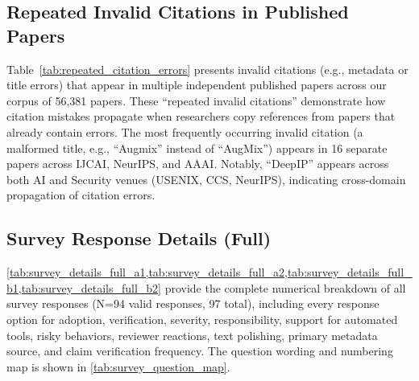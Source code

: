 

\subsection{Repeated Invalid Citations in Published Papers}
\label{app:repeated_citations}

Table~\ref{tab:repeated_citation_errors} presents invalid citations (e.g., metadata or title errors) that appear in multiple independent published papers across our corpus of 56,381 papers.
These ``repeated invalid citations'' demonstrate how citation mistakes propagate when researchers copy references from papers that already contain errors.
The most frequently occurring invalid citation (a malformed title, e.g., ``Augmix'' instead of ``AugMix'') appears in 16 separate papers across IJCAI, NeurIPS, and AAAI.
Notably, ``DeepIP'' appears across both AI and Security venues (USENIX, CCS, NeurIPS), indicating cross-domain propagation of citation errors.


\subsection{Survey Response Details (Full)}
\label{app:survey_details_full}

\cref{tab:survey_details_full_a1,tab:survey_details_full_a2,tab:survey_details_full_b1,tab:survey_details_full_b2} provide the complete numerical breakdown of all survey responses (N=94 valid responses, 97 total), including every response option for adoption, verification, severity, responsibility, support for automated tools, risky behaviors, reviewer reactions, text polishing, primary metadata source, and claim verification frequency. The question wording and numbering map is shown in \cref{tab:survey_question_map}.













